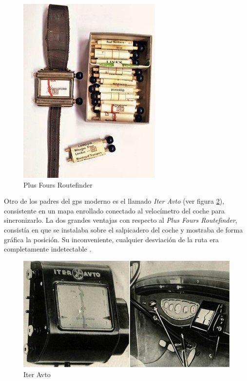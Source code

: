 \begin{figure}[h!btp]
\centering
\includegraphics[scale=0.5, fbox={\fboxrule} 4mm]{images/03-antecedentes/07-plus_fours_routefinder.png}
\caption{Plus Fours Routefinder}
\label{fig:plus_fours_routefinder}
\end{figure}

Otro de los padres del gps moderno es el llamado \textit{Iter Avto} (ver figura \ref{fig:iter_avto}), consistente en un mapa enrollado conectado al velocímetro del coche para sincronizarlo. La dos grandes ventajas con respecto al \textit{Plus Fours Routefinder}, consistía en que se instalaba sobre el salpicadero del coche y mostraba de forma gráfica la posición. Su inconveniente, cualquier desviación de la ruta era completamente indetectable \cite{Parra13}.

\begin{figure}[h!btp]
\centering
\includegraphics[scale=0.5, fbox={\fboxrule} 4mm]{images/03-antecedentes/08-iter_avto.png}
\caption{Iter Avto}
\label{fig:iter_avto}
\end{figure}

